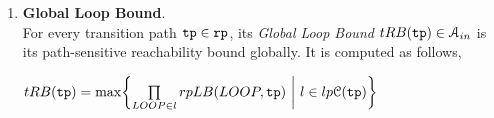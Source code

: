 \begin{enumerate}
  \item \textbf{Global Loop Bound}.
  \\
  For every transition path $\mathtt{tp} \in \mathtt{rp}$, its \emph{Global Loop Bound} $tRB(\mathtt{tp}) \in \mathcal{A}_{in}$ is 
  its path-sensitive reachability bound globally. It is computed as follows,
  \begin{defn}
   \label{def:global_loop_bound}
  $tRB(\tpath) = \max
  \left \{ \prod\limits_{LOOP \in l} rpLB(LOOP, \tpath)
  ~ \middle\vert~ l \in lp\mathcal{C}(\tpath) \right\}$
  \end{defn}
  \end{enumerate}
